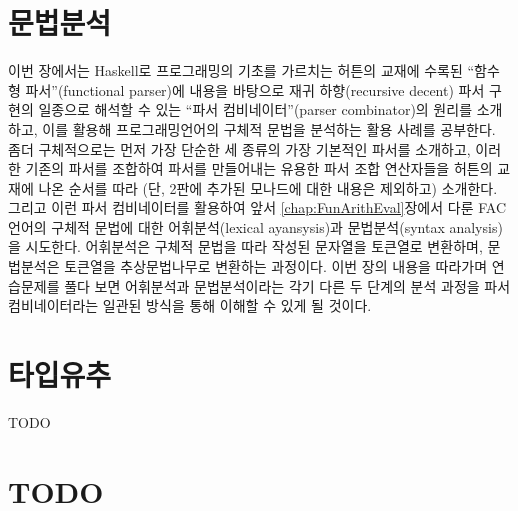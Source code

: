 \chapter{문법분석}\label{chap:parser}
이번 장에서는 Haskell로 프로그래밍의 기초를 가르치는
허튼\cite{Hutton2016pih2nd}의 교재에 수록된
``함수형 파서''(functional parser)에 내용을 바탕으로
재귀 하향(recursive decent) 파서 구현의 일종으로 해석할 수 있는
``파서 컴비네이터''(parser combinator)의 원리를 소개하고,
이를 활용해 프로그래밍언어의 구체적 문법을 분석하는 활용 사례를 공부한다.
좀더 구체적으로는 먼저 가장 단순한 세 종류의 가장 기본적인 파서를 소개하고,
이러한 기존의 파서를 조합하여 파서를 만들어내는 유용한 파서 조합 연산자들을
허튼의 교재에 나온 순서를 따라 (단, 2판에 추가된 모나드에 대한
내용은 제외하고) 소개한다. 그리고 이런 파서 컴비네이터를 활용하여
앞서 \ref{chap:FunArithEval}장에서 다룬 FAC언어의 구체적 문법에 대한
어휘분석(lexical ayansysis)과 문법분석(syntax analysis)을 시도한다.
어휘분석은 구체적 문법을 따라 작성된 문자열을 토큰열로 변환하며,
문법분석은 토큰열을 추상문법나무로 변환하는 과정이다.
이번 장의 내용을 따라가며 연습문제를 풀다 보면
어휘분석과 문법분석이라는 각기 다른 두 단계의 분석 과정을
파서 컴비네이터라는 일관된 방식을 통해 이해할 수 있게 될 것이다.
\newpage


\chapter{타입유추}\label{chap:tyinf}
TODO

\newpage
\chapter{TODO}


